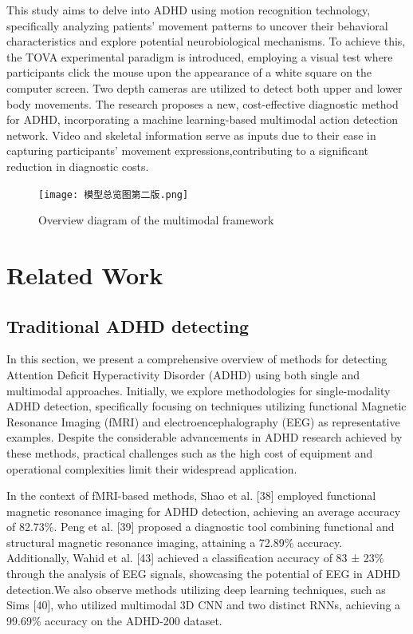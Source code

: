 \documentclass[conference,a4paper,english]{IEEEtran}[2015/08/26]
\begin{document}
 This study aims to delve into ADHD using motion recognition technology, 
 specifically analyzing patients' movement patterns to uncover their behavioral characteristics and 
 explore potential neurobiological mechanisms. To achieve this, the TOVA experimental paradigm is 
 introduced, employing a visual test where participants click the mouse upon the appearance of a white 
 square on the computer screen. 
 Two depth cameras are utilized to detect both upper and lower body movements. 
 The research proposes a new, cost-effective diagnostic method for ADHD, 
 incorporating a machine learning-based multimodal action detection network. 
 Video and skeletal information serve as inputs due to their ease in capturing participants' movement 
 expressions,contributing to a significant reduction in diagnostic costs.
\begin{figure}
  \centering
  \texttt{[image: 模型总览图第二版.png]}
  \caption[Simple Figure]{Overview diagram of the multimodal framework}
  \label{fig:label}
\end{figure}




\section{Related Work}
\label{sec:relatedwork}
\subsection{Traditional ADHD detecting}
In this section, we present a comprehensive overview of methods for detecting Attention Deficit 
Hyperactivity Disorder (ADHD) using both single and multimodal approaches. 
Initially, we explore methodologies for single-modality ADHD detection, 
specifically focusing on techniques utilizing functional Magnetic Resonance Imaging (fMRI) 
and electroencephalography (EEG) as representative examples. Despite the considerable advancements in 
ADHD research achieved by these methods, practical challenges such as the high cost of equipment and 
operational complexities limit their widespread application.

In the context of fMRI-based methods, Shao et al. [38] 
employed functional magnetic resonance imaging for ADHD detection, 
achieving an average accuracy of 82.73\%. 
Peng et al. [39] proposed a diagnostic tool combining functional and structural magnetic resonance 
imaging, attaining a 72.89\% 
accuracy. Additionally, Wahid et al. 
[43] achieved a classification accuracy of 83 ± 23\% 
through the analysis of EEG signals, showcasing the potential of EEG in ADHD detection.We also observe methods utilizing deep learning techniques, such as Sims [40], 
who utilized multimodal 3D CNN and two distinct RNNs, achieving a 99.69\% accuracy on the ADHD-200 dataset.
\end{document}
